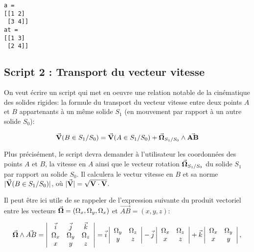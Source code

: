 \documentclass{article}
\begin{document}
    \begin{Verbatim}[commandchars=\\\{\}]
a = 
[[1 2]
 [3 4]]
at = 
[[1 3]
 [2 4]]

    \end{Verbatim}

    \subsection{Script 2 : Transport du vecteur
vitesse}\label{script-2-transport-du-vecteur-vitesse}

    On veut écrire un script qui met en oeuvre une relation notable de la
cinématique des solides rigides: la formule du transport du vecteur
vitesse entre deux points \(A\) et \(B\) appartenants à un même solide
\(S_1\) (en mouvement par rapport à un autre solide \(S_0\)):

    \[\vec{\bf V}(B \in S_1/S_0) = \vec{\bf V}(A \in S_1/S_0) + \vec{\bf \Omega}_{S_1/S_0} \wedge \vec{\bf AB}\]

    Plus précisément, le script devra demander à l'utilisateur les
coordonnées des points \(A\) et \(B\), la vitesse en \(A\) ainsi que le
vecteur rotation \(\vec{\bf \Omega}_{S_1/S_0}\) du solide \(S_1\) par
rapport au solide \(S_0\). Il calculera le vectur vitesse en \(B\) et sa
norme \(|\vec{\bf V}(B \in S_1/S_0)|\), où
\(|\vec{\bf V}|=\sqrt{{\bf V}\cdot{\bf V}}\).

    Il peut être ici utile de se rappeler de l'expression suivante du
produit vectoriel entre les vecteurs
\(\vec{\bf{\Omega}}=(\Omega_x,\Omega_y,\Omega_x)\) et
\(\vec{AB}=(x,y,z)\):

\[
\vec{\bf{\Omega}} \wedge \vec{AB}=
\left| \begin{array}{ccc}
\vec{i} & \vec{j} & \vec{k}  \\
\Omega_x & \Omega_y & \Omega_z \\
x & y & z
\end{array} \right| = 
\vec{i} \left| \begin{array}{cc}
\Omega_y & \Omega_z \\
y & z
\end{array}
\right| - 
\vec{j} \left| \begin{array}{cc}
\Omega_x & \Omega_z \\
x & z
\end{array}
\right| + 
\vec{k} \left| \begin{array}{cc}
\Omega_x & \Omega_y \\
x & y
\end{array}
\right|,
\]
\end{document}
